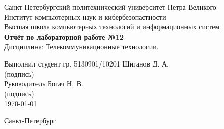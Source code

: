 \begin{titlepage}	%

	\begin{center}		%

		\large Санкт-Петербургский политехнический университет Петра Великого\\[.4cm]
		\large Институт компьютерных наук и кибербезопастности \\[.4cm]
		\large Высшая школа компьютерных технологий и информационных систем\\[6.5cm]
		
		\Large \textbf{Отчёт по лабораторной работе №12}\\[0.3cm]
		\large Дисциплина: Телекоммуникационные технологии.\\[5.5cm]

	\end{center}

	\large Выполнил студент гр. 5130901/10201\hfill \underline{\hphantom{(12подпись12)}} \hfill Шиганов Д. А.\\[.1cm]
	\large \hphantom{Выполнил студент гр. 5130901/10201}\hfill (подпись) \hfill \hphantom{Шиганов Д. А.}\\[2cm]

	\large Руководитель \hphantom{студент гр. 513090}\hfill \underline{\hphantom{(12подпись12)}} \hfill Богач Н. В.\\[.1cm]
	\large \hphantom{Выполнил студент гр. 5130901/10201}\hfill (подпись) \hfill \hphantom{Шиганов Д. А.}\\[2cm]

	\hfill\large \today

	\vfill %

	\begin{center}
	\large Санкт-Петербург\\
	\large \the\year %
	\end{center} %

\end{titlepage} %

\vfill %
